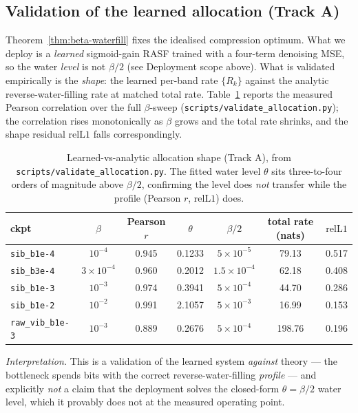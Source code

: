 \subsection{Validation of the learned allocation (Track A)}

Theorem~\ref{thm:beta-waterfill} fixes the idealised compression optimum. What we
deploy is a \emph{learned} sigmoid-gain RASF trained with a four-term denoising
MSE, so the water \emph{level} is not $\beta/2$ (see Deployment scope above).
What is validated empirically is the \emph{shape}: the learned per-band rate
$\{R_k\}$ against the analytic reverse-water-filling rate at matched total rate.
Table~\ref{tab:alloc} reports the measured Pearson correlation over the full
$\beta$-sweep (\texttt{scripts/validate\_allocation.py}); the correlation rises
monotonically as $\beta$ grows and the total rate shrinks, and the shape residual
$\mathrm{relL1}$ falls correspondingly.

\begin{table}[h]
\centering
\caption{Learned-vs-analytic allocation shape (Track A), from
\texttt{scripts/validate\_allocation.py}. The fitted water level $\theta$ sits
three-to-four orders of magnitude above $\beta/2$, confirming the level does
\emph{not} transfer while the profile (Pearson $r$, $\mathrm{relL1}$) does.}
\label{tab:alloc}
\begin{tabular}{lcccccc}
\hline
ckpt & $\beta$ & Pearson $r$ & $\theta$ & $\beta/2$ & total rate (nats) & $\mathrm{relL1}$ \\
\hline
\texttt{sib\_b1e-4}      & $10^{-4}$          & 0.945 & 0.1233 & $5\times10^{-5}$   & 79.13 & 0.517 \\
\texttt{sib\_b3e-4}      & $3\times10^{-4}$   & 0.960 & 0.2012 & $1.5\times10^{-4}$ & 62.18 & 0.408 \\
\texttt{sib\_b1e-3}      & $10^{-3}$          & 0.974 & 0.3941 & $5\times10^{-4}$   & 44.70 & 0.286 \\
\texttt{sib\_b1e-2}      & $10^{-2}$          & 0.991 & 2.1057 & $5\times10^{-3}$   & 16.99 & 0.153 \\
\texttt{raw\_vib\_b1e-3} & $10^{-3}$          & 0.889 & 0.2676 & $5\times10^{-4}$   & 198.76 & 0.196 \\
\hline
\end{tabular}
\end{table}

\noindent\emph{Interpretation.} This is a validation of the learned system
\emph{against} theory --- the bottleneck spends bits with the correct
reverse-water-filling \emph{profile} --- and explicitly \emph{not} a claim that
the deployment solves the closed-form $\theta=\beta/2$ water level, which it
provably does not at the measured operating point.

